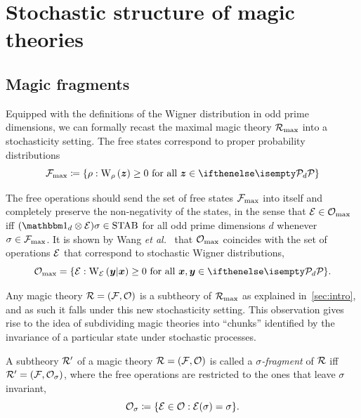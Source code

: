 \section{Stochastic structure of magic theories}
\label{sec:struc}

\subsection{Magic fragments}\label{sec:magfrag}

Equipped with the definitions of the Wigner distribution in odd prime dimensions, we can formally recast the maximal magic theory $\mathcal{R}_{\rm{}max}$ into a stochasticity setting.
The free states correspond to proper probability distributions 
\begin{equation}
    \Fmax \coloneqq \{ \rho: \W[\bmz]{\rho} \geq 0 \text{ for all } \bmz \in \pd\}
\end{equation}

The free operations should send the set of free states $\mathcal{F}_{\rm{max}}$ into itself and completely preserve the non-negativity of the states, in the sense that $\mathcal{E} \in \mathcal{O}_{\rm{}max}$ iff $(\id_d \otimes \E ) \sigma \in \stab$ for all odd prime dimensions $d$ whenever $\sigma \in \mathcal{F}_{\rm{max}}$.
It is shown by Wang \textit{et al.}~\cite{cit:wang} that $\mathcal{O}_{\rm{}max}$ coincides with the set of operations $\mathcal{E}$ that correspond to stochastic Wigner distributions, 
\begin{equation}
    \Omax = \{ \E: \W[\bmy|\bmx]{\E} \geq 0 \text{ for all } \bmx, \bmy \in \pd\}.
\end{equation}

Any magic theory $\mathcal{R} = (\mathcal{F}, \mathcal{O})$ is a subtheory of $\mathcal{R}_{\rm{}max}$ as explained in~\cref{sec:intro}, and as such it falls under this new stochasticity setting. 
This observation gives rise to the idea of subdividing magic theories into ``chunks'' identified by the invariance of a particular state under stochastic processes. 
\begin{definition}\label{def:sigmafrag}
    A subtheory $\mathcal{R}'$ of a magic theory $\mathcal{R} = (\mathcal{F}, \mathcal{O})$ is called a \emph{$\sigma$-fragment} of $\mathcal{R}$ iff $\mathcal{R}' = (\mathcal{F}, \mathcal{O}_\sigma)$, where the free operations are restricted to the ones that leave $\sigma$ invariant,
    \begin{equation}
        \mathcal{O}_\sigma \coloneqq \{ \mathcal{E} \in \mathcal{O}: \mathcal{E}(\sigma) = \sigma \}.
    \end{equation}
\end{definition}

